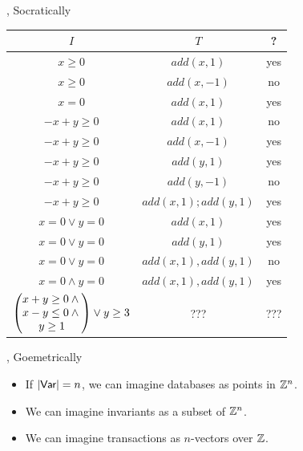 \documentclass[xcolor={dvipsnames,svgnames,table}]{beamer}
\begin{document}
\begin{frame}{\iconfluence{}, Socratically}
  \begin{center}
    \begin{tabular}{c|c|c}
      $I$                 & $T$                    & \iconfluent{}? \\\hline\hline
      $x \geq 0$          & $add(x, 1)$            & \pause yes \pause \\\hline
      $x \geq 0$          & $add(x, -1)$           & \pause no  \pause \\\hline
      $x = 0$             & $add(x, 1)$            & \pause yes \pause \\\hline
      $-x + y \geq 0$     & $add(x, 1)$            & \pause no  \pause \\\hline
      $-x + y \geq 0$     & $add(x, -1)$           & \pause yes \pause \\\hline
      $-x + y \geq 0$     & $add(y, 1)$            & \pause yes \pause \\\hline
      $-x + y \geq 0$     & $add(y, -1)$           & \pause no  \pause \\\hline
      $-x + y \geq 0$     & $add(x, 1); add(y, 1)$ & \pause yes \pause \\\hline
      $x = 0 \lor y = 0$  & $add(x, 1)$            & \pause yes \pause \\\hline
      $x = 0 \lor y = 0$  & $add(y, 1)$            & \pause yes \pause \\\hline
      $x = 0 \lor y = 0$  & $add(x, 1), add(y, 1)$ & \pause no  \pause \\\hline
      $x = 0 \land y = 0$ & $add(x, 1), add(y, 1)$ & \pause yes \pause \\\hline
      $\begin{pmatrix}
        x + y \geq 0 \land {} \\
        x - y \leq 0 \land {} \\
        y \geq 1
       \end{pmatrix} \lor y \geq 3$ & ???  & ??? \\
    \end{tabular}
  \end{center}
\end{frame}

\begin{frame}{\iconfluence{}, Goemetrically}
  \begin{itemize}
    \item
      If $|\textsf{Var}| = n$, we can imagine databases as points in $\mathbb{Z}^n$.
    \item
      We can imagine invariants as a subset of $\mathbb{Z}^n$.
    \item
      We can imagine transactions as $n$-vectors over $\mathbb{Z}$.
  \end{itemize}
\end{frame}
\end{document}
